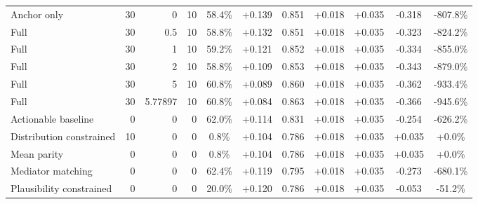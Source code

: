 \begin{table}[htbp]
\begin{tabular}{lrrrccccccc}
Anchor only & 30 & 0 & 10 & 58.4\% & +0.139 & 0.851 & +0.018 & +0.035 & -0.318 & -807.8\% \\
Full & 30 & 0.5 & 10 & 58.8\% & +0.132 & 0.851 & +0.018 & +0.035 & -0.323 & -824.2\% \\
Full & 30 & 1 & 10 & 59.2\% & +0.121 & 0.852 & +0.018 & +0.035 & -0.334 & -855.0\% \\
Full & 30 & 2 & 10 & 58.8\% & +0.109 & 0.853 & +0.018 & +0.035 & -0.343 & -879.0\% \\
Full & 30 & 5 & 10 & 60.8\% & +0.089 & 0.860 & +0.018 & +0.035 & -0.362 & -933.4\% \\
Full & 30 & 5.77897 & 10 & 60.8\% & +0.084 & 0.863 & +0.018 & +0.035 & -0.366 & -945.6\% \\
Actionable baseline & 0 & 0 & 0 & 62.0\% & +0.114 & 0.831 & +0.018 & +0.035 & -0.254 & -626.2\% \\
Distribution constrained & 10 & 0 & 0 & 0.8\% & +0.104 & 0.786 & +0.018 & +0.035 & +0.035 & +0.0\% \\
Mean parity & 0 & 0 & 0 & 0.8\% & +0.104 & 0.786 & +0.018 & +0.035 & +0.035 & +0.0\% \\
Mediator matching & 0 & 0 & 0 & 62.4\% & +0.119 & 0.795 & +0.018 & +0.035 & -0.273 & -680.1\% \\
Plausibility constrained & 0 & 0 & 0 & 20.0\% & +0.120 & 0.786 & +0.018 & +0.035 & -0.053 & -51.2\% \\
\bottomrule
\end{tabular}
\end{table}